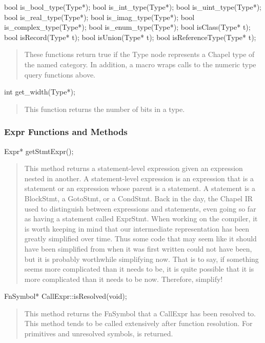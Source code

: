 \documentclass[10pt]{article}
\begin{document}
\begin{clang}
bool is_bool_type(Type*);
bool is_int_type(Type*);
bool is_uint_type(Type*);
bool is_real_type(Type*);
bool is_imag_type(Type*);
bool is_complex_type(Type*);
bool is_enum_type(Type*);
bool isClass(Type* t);
bool isRecord(Type* t);
bool isUnion(Type* t);
bool isReferenceType(Type* t);
\end{clang}
\begin{quote}
These functions return true if the Type node represents a Chapel type
of the named category.  In addition, a macro 
wraps calls to the numeric type query functions above.
\end{quote}

\begin{clang}
int get_width(Type*);
\end{clang}
\begin{quote}
This function returns the number of bits in a type.
\end{quote}

\subsubsection{Expr Functions and Methods}

\begin{clang}
Expr* getStmtExpr();
\end{clang}
\begin{quote}
This method returns a statement-level expression given an expression
nested in another.  A statement-level expression is an expression that
is a statement or an expression whose parent is a statement.  A
statement is a BlockStmt, a GotoStmt, or a CondStmt.  Back in the day,
the Chapel IR used to distinguish between expressions and statements,
even going so far as having a statement called ExprStmt.  When working
on the compiler, it is worth keeping in mind that our intermediate
representation has been greatly simplified over time.  Thus some code
that may seem like it should have been simplified from when it was
first written could not have been, but it is probably worthwhile
simplifying now.  That is to say, if something seems more complicated
than it needs to be, it is quite possible that it is more complicated
than it needs to be now.  Therefore, simplify!
\end{quote}

\begin{clang}
FnSymbol* CallExpr::isResolved(void);
\end{clang}
\begin{quote}
This method returns the FnSymbol that a CallExpr has been resolved to.
This method tends to be called extensively after function resolution.
For primitives and unresolved symbols,  is returned.
\end{quote}
\end{document}
